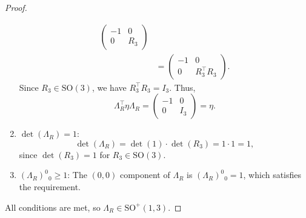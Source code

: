 \documentclass{amsart}
\theoremstyle{definition}
\theoremstyle{remark}
\begin{document}
\begin{proof}
\begin{enumerate}
\begin{align*}
          \begin{pmatrix}
            -1 & 0 \\
            0 & R_3
          \end{pmatrix} \\
          &=
          \begin{pmatrix}
            -1 & 0 \\
            0 & R_3^\top R_3
          \end{pmatrix}.
        \end{align*}
      Since $R_3 \in \mathrm{SO}(3)$, we have $R_3^\top R_3 = I_3$.
      Thus,
      \begin{equation*}
        \Lambda_R^\top\eta \Lambda_R =
        \begin{pmatrix}
          -1 & 0 \\
          0 & I_3
        \end{pmatrix}
        = \eta.
      \end{equation*}
      \item $\det(\Lambda_R) = 1$:
      \begin{equation*}
        \det(\Lambda_R) = \det(1) \cdot \det(R_3) = 1 \cdot 1 = 1,
      \end{equation*}
      since $\det(R_3)=1$ for $R_3 \in \mathrm{SO}(3)$.
      \item $(\Lambda_R)^0{}_0 \geq 1$:
      The $(0,0)$ component of $\Lambda_R$ is $(\Lambda_R)^0{}_0 = 1$, which satisfies the requirement.
  \end{enumerate}
  All conditions are met, so $\Lambda_R \in \mathrm{SO}^+(1,3)$.
\end{proof}
\end{document}

